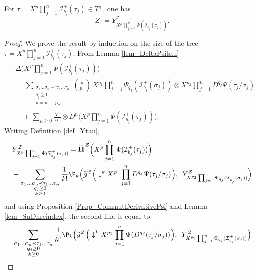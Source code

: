 \documentclass[11pt]{preprint}
\newcommand{\mcI}{\mathcal{I}}
\newcommand{\mcZ}{\mathcal{Z}}
\def\PPi{\boldsymbol{\Pi}}
\begin{document}
	
	\begin{proposition}\label{prop_Ztau=YPsitau_mult}
		For $\tau = X^p\prod_{j=1}^n\mcI^+_{b_j}(\tau_j) \in T^+$, one has
		$$
		Z_\tau = Y_{X^p\prod_{j=1}^n\Psi(\mcI^+_{b_j}(\tau_j))}^\mcZ.
		$$
	\end{proposition}
	

	\begin{proof}
		We prove the result by induction on the size of the tree $\tau=X^p\prod_{j=1}^n\mcI^+_{b_j}(\tau_j)$.
		From Lemma \ref{lem_DeltaPsitau}
		\begin{align*}
	&	\Delta\Big(X^p\prod_{j=1}^n\Psi(\mcI^+_{b_j}(\tau_j))\Big) \\ &= \sum_{\substack{\sigma_1\dots\sigma_n\prec\tau_1\dots\tau_n \\ q_j\geq 0\\ p=p_1+p_2}}\binom{p}{p_1}\, X^{p_1} \prod_{j=1}^{n} \Psi_{q_j}(\mcI_{b_j}^+ (\sigma_j))   
		\otimes
	X^{p_2}\prod_{j=1}^{n} D^{q_j} \Psi(\tau_j/\sigma_j)
	\\
	&\quad + \sum_{n\geq0} \frac{X^n}{n!} \otimes D^n \Big(X^p\prod_{j=1}^n\Psi(\mcI^+_{b_j}(\tau_j))\Big).
		\end{align*}
		Writing Definition \ref{def_Ytau}, %
		\begin{align*}
		&	 Y_{X^p\prod_{j=1}^n\Psi(\mcI^+_{b_j}(\tau_j))}^\mcZ = \widetilde{\PPi}^\mcZ\Big( X^p\prod_{j=1}^n\Psi(\mcI^+_{b_j}(\tau_j)) \Big) 
			 \\
			 &- \sum_{\substack{\sigma_1\dots\sigma_n\prec\tau_1\dots\tau_n \\q_j \geq 0 \\ k\geq0 }} \frac{1}{k!}\P_k\Big(  \widetilde{ g}^\mcZ\Big( \downarrow^k X^{p_1}\prod_{j=1}^n D^{q_j}\Psi(\tau_j/\sigma_j)    \Big) ,\enskip  Y^\mcZ_{X^{p_2}\prod_{j=1}^n\Psi_{q_j}(\mcI^+_{b_j}(\sigma_j)) }  \Big)
		\end{align*} and
		using Proposition \ref{Prop_CommutDerivativePsi} and Lemma \ref{lem_SnDnreindex}, the second line is equal to 
		\begin{align*}
			 &\sum_{\substack{\sigma_1\dots\sigma_n\prec\tau_1\dots\tau_n \\q_j \geq 0 \\ k\geq0 }} \frac{1}{k!}\P_k\Big( \widetilde{ g}^\mcZ\Big(  \downarrow^k X^{p_1} \prod_{j=1}^n\Psi(  D^{q_j}(\tau_j/\sigma_j) )   \Big) ,\enskip  Y^\mcZ_{X^{p_2}\prod_{j=1}^n\Psi_{q_j}(\mcI^+_{b_j}(\sigma_j)) }  \Big)
			 \\

\end{align*}
\end{proof}
\end{document}

